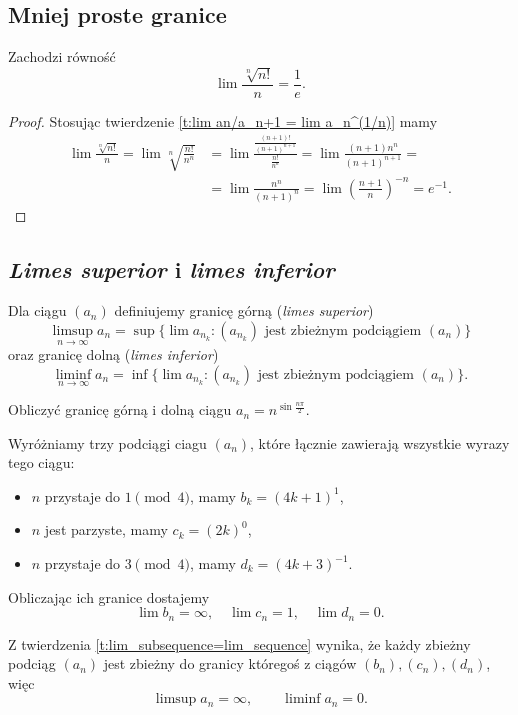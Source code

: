 \subsection{Mniej proste granice}
\begin{theorem}
    Zachodzi równość
    \[ \lim\frac{\sqrt[n]{n!}}{n} = \frac{1}{e}. \]
\end{theorem}
\begin{proof}
    Stosując twierdzenie \ref{t:lim an/a_n+1 = lim a_n^(1/n)} mamy
    \[\begin{aligned} \lim\frac{\sqrt[n]{n!}}{n} = \lim\sqrt[n]{\frac{n!}{n^n}} &= \lim\frac{\frac{(n+1)!}{(n+1)^{n+1}}}{\frac{n!}{n^n}} = \lim\frac{(n+1)n^n}{(n+1)^{n+1}} = \\
        &= \lim\frac{n^n}{(n+1)^n} = \lim\left(\frac{n+1}{n}\right)^{-n} = e^{-1}. \end{aligned}\]
\end{proof}

\subsection{\textit{Limes superior} i \textit{limes inferior}}
\begin{definition}
    Dla ciągu $(a_n)$ definiujemy granicę górną (\textit{limes superior})
    \[ \limsup_{n \to \infty} a_n = \sup\{\lim a_{n_k} : (a_{n_k}) \text{ jest zbieżnym podciągiem } (a_n)\} \]
    oraz granicę dolną (\textit{limes inferior})
    \[ \liminf_{n \to \infty} a_n = \inf\{\lim a_{n_k} : (a_{n_k}) \text{ jest zbieżnym podciągiem } (a_n)\}. \]
\end{definition}

\begin{example}
    Obliczyć granicę górną i dolną ciągu $a_n = n^{\sin\frac{n\pi}{2}}$.
\end{example}
\begin{solution}
    Wyróżniamy trzy podciągi ciagu $(a_n)$, które łącznie zawierają wszystkie wyrazy tego ciągu:
    \begin{itemize}
        \item $n$ przystaje do $1 \pmod{4}$, mamy $b_k = (4k + 1)^1$,
        \item $n$ jest parzyste, mamy $c_k = (2k)^0$,
        \item $n$ przystaje do $3 \pmod{4}$, mamy $d_k = (4k + 3)^{-1}$.
    \end{itemize}

    Obliczając ich granice dostajemy
    \[ \lim b_n = \infty, \quad \lim c_n = 1, \quad \lim d_n = 0. \]

    Z twierdzenia \ref{t:lim_subsequence=lim_sequence} wynika, że każdy zbieżny podciąg $(a_n)$ jest zbieżny do granicy któregoś z ciągów $(b_n), (c_n), (d_n)$, więc
    \[ \limsup a_n = \infty, \qquad \liminf a_n = 0. \]
\end{solution}